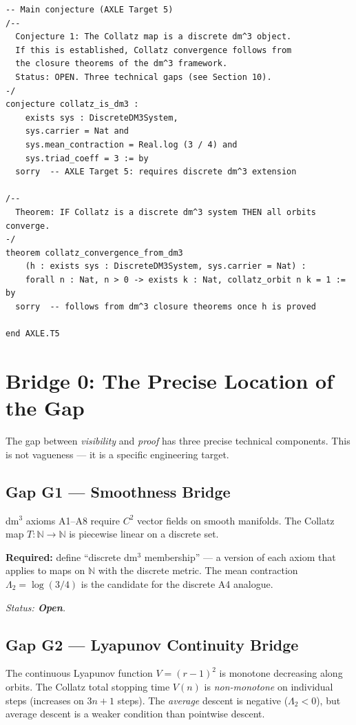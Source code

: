 \documentclass[11pt, a4paper]{article}
\theoremstyle{definition}
\newcommand{\Lam}{\Lambda}
\begin{document}
\begin{lstlisting}[language=Lean4, caption={AXLE Target 5 --- Lean 4 skeleton (AXLE/Targets/T5\_Collatz.lean)}, label={lst:lean}]
-- Main conjecture (AXLE Target 5)
/--
  Conjecture 1: The Collatz map is a discrete dm^3 object.
  If this is established, Collatz convergence follows from
  the closure theorems of the dm^3 framework.
  Status: OPEN. Three technical gaps (see Section 10).
-/
conjecture collatz_is_dm3 :
    exists sys : DiscreteDM3System,
    sys.carrier = Nat and
    sys.mean_contraction = Real.log (3 / 4) and
    sys.triad_coeff = 3 := by
  sorry  -- AXLE Target 5: requires discrete dm^3 extension

/--
  Theorem: IF Collatz is a discrete dm^3 system THEN all orbits converge.
-/
theorem collatz_convergence_from_dm3
    (h : exists sys : DiscreteDM3System, sys.carrier = Nat) :
    forall n : Nat, n > 0 -> exists k : Nat, collatz_orbit n k = 1 := by
  sorry  -- follows from dm^3 closure theorems once h is proved

end AXLE.T5
\end{lstlisting}

\section{Bridge 0: The Precise Location of the Gap}
\label{sec:bridge}

The gap between \emph{visibility} and \emph{proof} has three precise technical components.
This is not vagueness --- it is a specific engineering target.

\subsection*{Gap G1 --- Smoothness Bridge}
dm$^3$ axioms A1--A8 require $C^2$ vector fields on smooth manifolds.
The Collatz map $T: \mathbb{N} \to \mathbb{N}$ is piecewise linear on a discrete set.

\textbf{Required:} define ``discrete dm$^3$ membership'' --- a version of each axiom that applies
to maps on $\mathbb{N}$ with the discrete metric. The mean contraction
$\Lam_2 = \log(3/4)$ is the candidate for the discrete A4 analogue.

\medskip\textit{Status: \textbf{Open}.}

\subsection*{Gap G2 --- Lyapunov Continuity Bridge}
The continuous Lyapunov function $V = (r-1)^2$ is monotone decreasing along orbits.
The Collatz total stopping time $V(n)$ is \emph{non-monotone} on individual steps
(increases on $3n+1$ steps). The \emph{average} descent is negative ($\Lam_2 < 0$),
but average descent is a weaker condition than pointwise descent.
\end{document}
